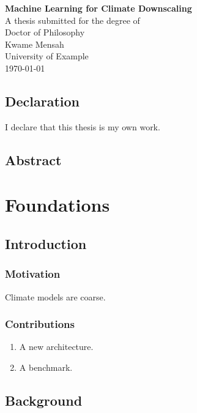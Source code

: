 \documentclass[12pt,oneside]{book}
\begin{document}
\frontmatter
\begin{titlepage}
  \begin{center}
    \vspace*{1in}
    {\huge\textbf{Machine Learning for Climate Downscaling}}\\[1.5cm]
    {\Large A thesis submitted for the degree of\\ Doctor of Philosophy}\\[1cm]
    {\large Kwame Mensah}\\
    \vfill
    University of Example\\
    \today
  \end{center}
\end{titlepage}

\chapter*{Declaration}
I declare that this thesis is my own work.

\chapter*{Abstract}
\blindtext

\tableofcontents
\listoffigures

\mainmatter
\part{Foundations}
\chapter{Introduction}\label{chap:intro}
\section{Motivation}
Climate models are coarse. \lipsum[2-3]

\section{Contributions}\label{sec:contrib}
\begin{enumerate}
\item A new architecture.
\item A benchmark.
\end{enumerate}

\chapter{Background}
\end{document}
